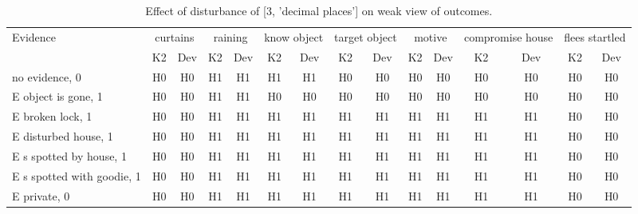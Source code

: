 \begin{table}\begin{tabular}{l|cc|cc|cc|cc|cc|cc|cc}\toprule\multirow{2}{*}{Evidence} & \multicolumn{2}{c}{curtains}& \multicolumn{2}{c}{raining}& \multicolumn{2}{c}{know object}& \multicolumn{2}{c}{target object}& \multicolumn{2}{c}{motive}& \multicolumn{2}{c}{compromise house}& \multicolumn{2}{c}{flees startled}\\& {K2} & {Dev}& {K2} & {Dev}& {K2} & {Dev}& {K2} & {Dev}& {K2} & {Dev}& {K2} & {Dev}& {K2} & {Dev}\\\midrule
no evidence, 0 & H0&H0&H1&H1&H1&H1&H0&H0&H0&H0&H0&H0&H0&H0\\E object is gone, 1 & H0&H0&H1&H1&H0&H0&H0&H0&H0&H0&H0&H0&H0&H0\\E broken lock, 1 & H0&H0&H1&H1&H1&H1&H1&H1&H1&H1&H1&H1&H0&H0\\E disturbed house, 1 & H0&H0&H1&H1&H1&H1&H1&H1&H1&H1&H1&H1&H0&H0\\E s spotted by house, 1 & H0&H0&H1&H1&H1&H1&H1&H1&H1&H1&H1&H1&H0&H0\\E s spotted with goodie, 1 & H0&H0&H1&H1&H1&H1&H1&H1&H1&H1&H1&H1&H0&H0\\E private, 0 & H0&H0&H1&H1&H1&H1&H1&H1&H1&H1&H1&H1&H0&H0\\\bottomrule\end{tabular}\caption{Effect of disturbance of [3, 'decimal places'] on weak view of outcomes.}\end{table}